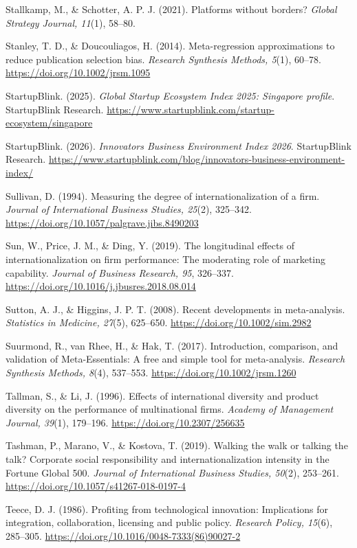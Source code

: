 \documentclass[
  a4paper,
  13pt]{extreport}
\begin{document}
Stallkamp, M., \& Schotter, A. P. J. (2021). Platforms without borders?
\emph{Global Strategy Journal, 11}(1), 58--80.

Stanley, T. D., \& Doucouliagos, H. (2014). Meta-regression
approximations to reduce publication selection bias. \emph{Research
Synthesis Methods, 5}(1), 60--78.
\url{https://doi.org/10.1002/jrsm.1095}

StartupBlink. (2025). \emph{Global Startup Ecosystem Index 2025:
Singapore profile}. StartupBlink Research.
\url{https://www.startupblink.com/startup-ecosystem/singapore}

StartupBlink. (2026). \emph{Innovators Business Environment Index 2026}.
StartupBlink Research.
\url{https://www.startupblink.com/blog/innovators-business-environment-index/}

Sullivan, D. (1994). Measuring the degree of internationalization of a
firm. \emph{Journal of International Business Studies, 25}(2), 325--342.
\url{https://doi.org/10.1057/palgrave.jibs.8490203}

Sun, W., Price, J. M., \& Ding, Y. (2019). The longitudinal effects of
internationalization on firm performance: The moderating role of
marketing capability. \emph{Journal of Business Research, 95}, 326--337.
\url{https://doi.org/10.1016/j.jbusres.2018.08.014}

Sutton, A. J., \& Higgins, J. P. T. (2008). Recent developments in
meta-analysis. \emph{Statistics in Medicine, 27}(5), 625--650.
\url{https://doi.org/10.1002/sim.2982}

Suurmond, R., van Rhee, H., \& Hak, T. (2017). Introduction, comparison,
and validation of Meta-Essentials: A free and simple tool for
meta-analysis. \emph{Research Synthesis Methods, 8}(4), 537--553.
\url{https://doi.org/10.1002/jrsm.1260}

Tallman, S., \& Li, J. (1996). Effects of international diversity and
product diversity on the performance of multinational firms.
\emph{Academy of Management Journal, 39}(1), 179--196.
\url{https://doi.org/10.2307/256635}

Tashman, P., Marano, V., \& Kostova, T. (2019). Walking the walk or
talking the talk? Corporate social responsibility and
internationalization intensity in the Fortune Global 500. \emph{Journal
of International Business Studies, 50}(2), 253--261.
\url{https://doi.org/10.1057/s41267-018-0197-4}

Teece, D. J. (1986). Profiting from technological innovation:
Implications for integration, collaboration, licensing and public
policy. \emph{Research Policy, 15}(6), 285--305.
\url{https://doi.org/10.1016/0048-7333(86)90027-2}
\end{document}
